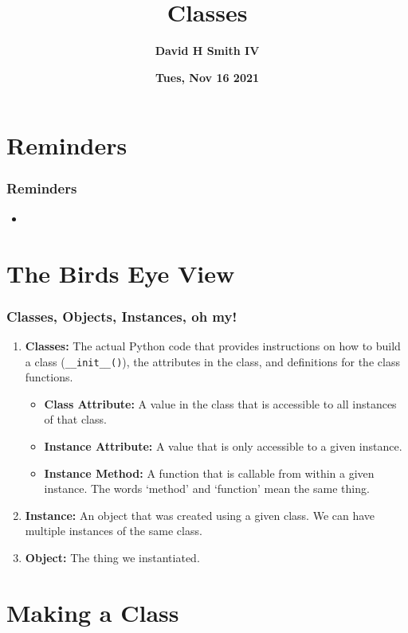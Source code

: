 \documentclass{beamer}
\title{\textbf{Classes}}
\author{\textbf{David H Smith IV}}
\institute[\textbf{UIUC}]{\textbf{University of Illinois Urbana-Champaign}}
\date{\textbf{Tues, Nov 16 2021}}
\begin{document}
\frame{\titlepage}

\section{Reminders}

%
%
\begin{frame}
	\frametitle{Reminders}
	\begin{itemize}
		\item 
	\end{itemize}
\end{frame}

\section{The Birds Eye View}

%
%
\begin{frame}[fragile]
	\frametitle{Classes, Objects, Instances, oh my!}
	\begin{enumerate}[A]
		\item \textbf{Classes:} The actual Python code that provides instructions on how to build a class (\lstinline|__init__()|), the attributes in the class, and definitions for the class functions.
			\begin{itemize}
				\item \textbf{Class Attribute: } A value in the class that is accessible to all instances of that class.
				\item \textbf{Instance Attribute: } A value that is only accessible to a given instance.
				\item \textbf{Instance Method: } A function that is callable from within a given instance. The words `method' and `function' mean the same thing.
			\end{itemize}
		\item \textbf{Instance:} An object that was created using a given class. We can have multiple instances of the same class.
		\item \textbf{Object:} The thing we instantiated.
	\end{enumerate}
\end{frame}

\section{Making a Class}
\end{document}
